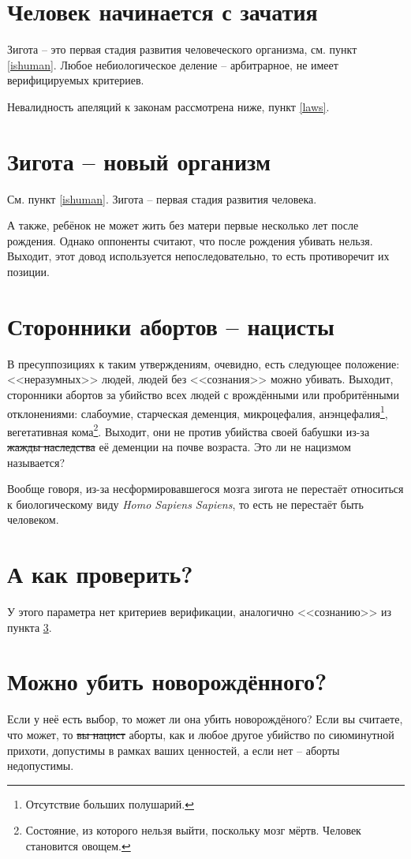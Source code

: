 \documentclass[a4paper,12pt]{report}
\begin{document}
	\section{Человек начинается с зачатия}
        Зигота -- это первая стадия развития человеческого организма, см. пункт \ref{ishuman}. 
        Любое небиологическое деление -- арбитрарное, не имеет верифицируемых критериев. 

        Невалидность апеляций к законам рассмотрена ниже, пункт \ref{laws}.
	\section{Зигота -- новый организм}
        См. пункт \ref{ishuman}. Зигота -- первая стадия развития человека.

        А также, ребёнок не может жить без матери первые несколько лет после рождения. 
        Однако оппоненты считают, что после рождения убивать нельзя.
        Выходит, этот довод используется непоследовательно, то есть противоречит их позиции.
    \section{Сторонники абортов -- нацисты}\label{nazi}
        В пресуппозициях к таким утверждениям, очевидно, есть следующее положение: 
        <<неразумных>> людей, людей без <<сознания>> можно убивать. 
	    Выходит, сторонники абортов за убийство всех людей с врождёнными или 
        пробритёнными отклонениями: слабоумие, старческая деменция, микроцефалия, 
        анэнцефалия\footnote{Отсутствие больших полушарий.}, вегетативная 
        кома\footnote{Состояние, из которого нельзя выйти, поскольку мозг 
        мёртв. Человек становится овощем.}. 
        Выходит, они не против убийства своей бабушки из-за \sout{жажды наследства} 
        её деменции на почве возраста. Это ли не нацизмом называется?
        
        Вообще говоря, из-за несформировавшегося мозга зигота не перестаёт относиться к 
        биологическому виду \textit{Homo Sapiens Sapiens}, то есть не перестаёт быть человеком.
    \section{А как проверить?}
        У этого параметра нет критериев верификации, аналогично <<сознанию>> из пункта \ref{nazi}.
	\section{Можно убить новорождённого?}
        Если у неё есть выбор, то может ли она убить новорождёного? 
        Если вы считаете, что может, то \sout{вы нацист} аборты, как и любое другое 
        убийство по сиюминутной прихоти, допустимы в рамках ваших ценностей, а 
        если нет -- аборты недопустимы.
\end{document}
